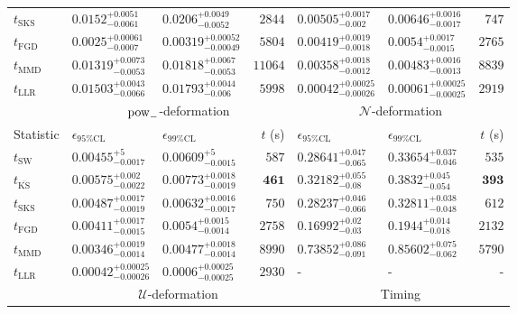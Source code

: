 \begin{tabular}{l|llr|llr}
	$t_{\mathrm{SKS}}$ & $0.0152_{-0.0061}^{+0.0051}$ & $0.0206_{-0.0052}^{+0.0049}$ & $2844$ & $0.00505_{-0.002}^{+0.0017}$ & $0.00646_{-0.0017}^{+0.0016}$ & $747$ \\
	$t_{\mathrm{FGD}}$ & ${\mathbf{0.0025_{-0.0007}^{+0.00061}}}$ & ${\mathbf{0.00319_{-0.00049}^{+0.00052}}}$ & $5804$ & $0.00419_{-0.0018}^{+0.0019}$ & $0.0054_{-0.0015}^{+0.0017}$ & $2765$ \\
	$t_{\mathrm{MMD}}$ & $0.01319_{-0.0053}^{+0.0073}$ & $0.01818_{-0.0053}^{+0.0067}$ & $11064$ & ${\mathbf{0.00358_{-0.0012}^{+0.0018}}}$ & ${\mathbf{0.00483_{-0.0013}^{+0.0016}}}$ & $8839$ \\
	$t_{\mathrm{LLR}}$ & $0.01503_{-0.0066}^{+0.0043}$ & $0.01793_{-0.006}^{+0.0044}$ & $5998$ & $0.00042_{-0.00026}^{+0.00025}$ & $0.00061_{-0.00025}^{+0.00025}$ & $2919$ \\
	\toprule
	\multicolumn{1}{c}{} & \multicolumn{3}{c}{$\rm{pow}_{-}$-deformation} & \multicolumn{3}{c}{$\mathcal{N}$-deformation} \\
	Statistic & $\epsilon_{95\%\mathrm{CL}}$ & $\epsilon_{99\%\mathrm{CL}}$ & $t$ (s) & $\epsilon_{95\%\mathrm{CL}}$ & $\epsilon_{99\%\mathrm{CL}}$ & $t$ (s) \\
	\midrule
	$t_{\mathrm{SW}}$ & $0.00455_{-0.0017}^{+5}$ & $0.00609_{-0.0015}^{+5}$ & $587$ & $0.28641_{-0.065}^{+0.047}$ & $0.33654_{-0.046}^{+0.037}$ & $535$ \\
	$t_{\overline{\mathrm{KS}}}$ & $0.00575_{-0.0022}^{+0.002}$ & $0.00773_{-0.0019}^{+0.0018}$ & ${\mathbf{461}}$ & $0.32182_{-0.08}^{+0.055}$ & $0.3832_{-0.054}^{+0.045}$ & ${\mathbf{393}}$ \\
	$t_{\mathrm{SKS}}$ & $0.00487_{-0.0019}^{+0.0017}$ & $0.00632_{-0.0017}^{+0.0016}$ & $750$ & $0.28237_{-0.066}^{+0.046}$ & $0.32811_{-0.048}^{+0.038}$ & $612$ \\
	$t_{\mathrm{FGD}}$ & $0.00411_{-0.0015}^{+0.0017}$ & $0.0054_{-0.0014}^{+0.0015}$ & $2758$ & ${\mathbf{0.16992_{-0.03}^{+0.02}}}$ & ${\mathbf{0.1944_{-0.018}^{+0.014}}}$ & $2132$ \\
	$t_{\mathrm{MMD}}$ & ${\mathbf{0.00346_{-0.0014}^{+0.0019}}}$ & ${\mathbf{0.00477_{-0.0014}^{+0.0018}}}$ & $8990$ & $0.73852_{-0.091}^{+0.086}$ & $0.85602_{-0.062}^{+0.075}$ & $5790$ \\
	$t_{\mathrm{LLR}}$ & $0.00042_{-0.00026}^{+0.00025}$ & $0.0006_{-0.00025}^{+0.00025}$ & $2930$ & - & - & - \\
	\toprule
	\multicolumn{1}{c}{} & \multicolumn{3}{c}{$\mathcal{U}$-deformation} & \multicolumn{3}{c}{Timing} \\

\end{tabular}
